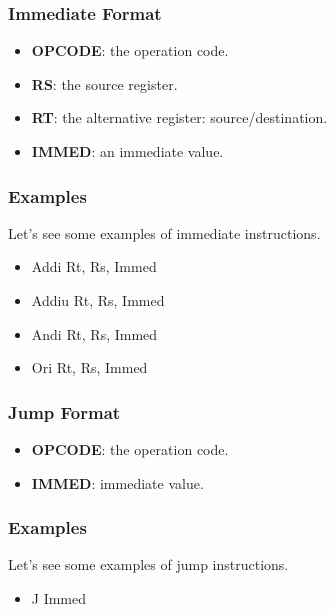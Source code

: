 
\begin{frame}
  \frametitle{Immediate Format}

  \begin{center}
  \end{center}

  \begin{itemize}
    \item
      \textbf{OPCODE}: the operation code.
    \item
      \textbf{RS}: the source register.
    \item
      \textbf{RT}: the alternative register: source/destination.
    \item
      \textbf{IMMED}: an immediate value.
  \end{itemize}
\end{frame}


\begin{frame}
  \frametitle{Examples}

  Let's see some examples of immediate instructions.

  \begin{itemize}
    \item
      Addi Rt, Rs, Immed
    \item
      Addiu Rt, Rs, Immed
    \item
      Andi Rt, Rs, Immed
    \item
      Ori Rt, Rs, Immed
  \end{itemize}
\end{frame}


\begin{frame}
  \frametitle{Jump Format}

  \begin{center}
  \end{center}

  \begin{itemize}
    \item
      \textbf{OPCODE}: the operation code.
    \item
      \textbf{IMMED}: immediate value.
  \end{itemize}
\end{frame}


\begin{frame}
  \frametitle{Examples}

  Let's see some examples of jump instructions.

  \begin{itemize}
    \item
      J Immed
  \end{itemize}
\end{frame}

